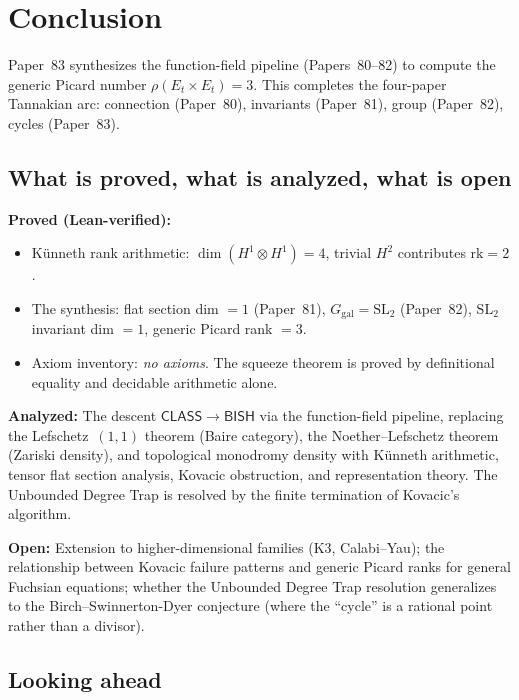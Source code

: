 \documentclass[11pt]{article}
\theoremstyle{plain}
\theoremstyle{definition}
\theoremstyle{remark}
\newcommand{\SL}{\mathrm{SL}}
\newcommand{\rk}{\mathrm{rk}}
\newcommand{\Ggal}{G_{\mathrm{gal}}}
\newcommand{\BISH}{\mathsf{BISH}}
\newcommand{\CLASS}{\mathsf{CLASS}}
\begin{document}
\section{Conclusion}
\label{sec:conclusion}

Paper~83 synthesizes the function-field pipeline (Papers~80--82) to compute the generic Picard number $\rho(E_t \times E_t) = 3$.
This completes the four-paper Tannakian arc: connection (Paper~80), invariants (Paper~81), group (Paper~82), cycles (Paper~83).

\subsection{What is proved, what is analyzed, what is open}

\textbf{Proved (Lean-verified):}
\begin{itemize}
  \item K\"unneth rank arithmetic: $\dim(H^1 \otimes H^1) = 4$, trivial $H^2$ contributes $\rk = 2$.
  \item The synthesis: flat section dim $= 1$ (Paper~81), $\Ggal = \SL_2$ (Paper~82), $\SL_2$ invariant dim $= 1$, generic Picard rank $= 3$.
  \item Axiom inventory: \emph{no axioms}. The squeeze theorem is proved by definitional equality and decidable arithmetic alone.
\end{itemize}

\textbf{Analyzed:} The descent $\CLASS \to \BISH$ via the function-field pipeline, replacing the Lefschetz~$(1,1)$ theorem (Baire category), the Noether--Lefschetz theorem (Zariski density), and topological monodromy density with K\"unneth arithmetic, tensor flat section analysis, Kovacic obstruction, and representation theory.
The Unbounded Degree Trap is resolved by the finite termination of Kovacic's algorithm.

\textbf{Open:}
Extension to higher-dimensional families (K3, Calabi--Yau); the relationship between Kovacic failure patterns and generic Picard ranks for general Fuchsian equations; whether the Unbounded Degree Trap resolution generalizes to the Birch--Swinnerton-Dyer conjecture (where the ``cycle'' is a rational point rather than a divisor).

\subsection{Looking ahead}
\end{document}
